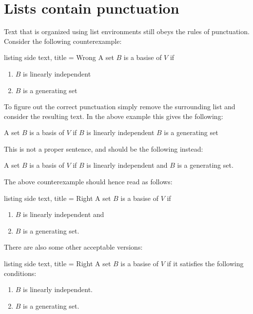 \section{Lists contain punctuation}

Text that is organized using list environments still obeys the rules of punctuation.
Consider the following counterexample:
\begin{tcblisting}{listing side text, title = {Wrong}}
  A set $B$ is a basise of $V$ if
  \begin{enumerate}
    \item
      $B$ is linearly independent
    \item
      $B$ is a generating set
  \end{enumerate}
\end{tcblisting}
To figure out the correct punctuation simply remove the surrounding list and consider the resulting text.
In the above example this gives the following:
\begin{center}
  A set $B$ is a basis of $V$ if $B$ is linearly independent $B$ is a generating set
\end{center}
This is not a proper sentence, and should be the following instead:
\begin{center}
  A set $B$ is a basis of $V$ if $B$ is linearly independent and $B$ is a generating set.
\end{center}
The above counterexample should hence read as follows:
\begin{tcblisting}{listing side text, title = {Right}}
  A set $B$ is a basise of $V$ if
  \begin{enumerate}
    \item
      $B$ is linearly independent and
    \item
      $B$ is a generating set.
  \end{enumerate}
\end{tcblisting}
There are also some other acceptable versions:
\begin{tcblisting}{listing side text, title = {Right}}
  A set $B$ is a basise of $V$ if it satisfies the following conditions:
  \begin{enumerate}
    \item
      $B$ is linearly independent.
    \item
      $B$ is a generating set.
  \end{enumerate}
\end{tcblisting}




